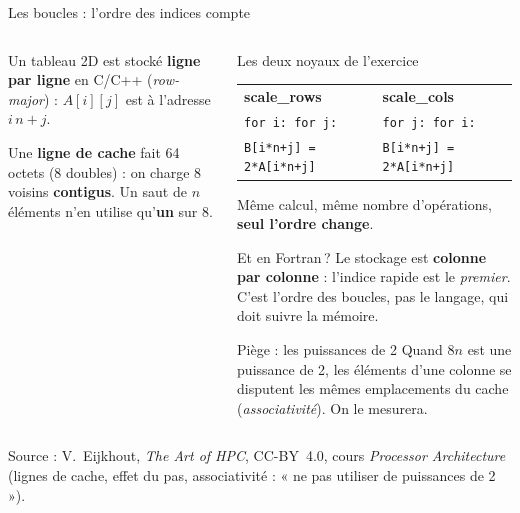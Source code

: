 \documentclass[8pt,aspectratio=169]{beamer}
\newcommand{\src}[1]{\vfill{\tiny\color{gray}Source : #1\par}}
\newcommand{\eij}{V.~Eijkhout, \emph{The Art of HPC}, CC-BY~4.0}
\begin{document}
\begin{frame}{Les boucles : l'ordre des indices compte}
\begin{columns}[T]
\begin{column}{0.5\textwidth}
Un tableau 2D est stocké \textbf{ligne par ligne} en C/C++ (\emph{row-major}) : $A[i][j]$ est à l'adresse $i\,n+j$.

\medskip
\centering
{}

\medskip
\raggedright
Une \textbf{ligne de cache} fait 64 octets (8 doubles) : on charge 8 voisins \textbf{contigus}. Un saut de $n$ éléments n'en utilise qu'\textbf{un} sur 8.
\end{column}
\begin{column}{0.46\textwidth}
\begin{block}{Les deux noyaux de l'exercice}
\begin{tabular}{@{}L{3.4cm}L{3.4cm}@{}}
\textbf{scale\_rows} & \textbf{scale\_cols}\\
\texttt{for i: for j:} & \texttt{for j: for i:}\\
\texttt{B[i*n+j] = 2*A[i*n+j]} & \texttt{B[i*n+j] = 2*A[i*n+j]}\\
\end{tabular}
\end{block}
Même calcul, même nombre d'opérations, \textbf{seul l'ordre change}.

\medskip
\begin{alertblock}{Et en Fortran\,?}
Le stockage est \textbf{colonne par colonne} : l'indice rapide est le \emph{premier}. C'est l'ordre des boucles, pas le langage, qui doit suivre la mémoire.
\end{alertblock}
\begin{exampleblock}{Piège : les puissances de 2}
Quand $8n$ est une puissance de 2, les éléments d'une colonne se disputent les mêmes emplacements du cache (\emph{associativité}). On le mesurera.
\end{exampleblock}
\end{column}
\end{columns}
\src{\eij{}, cours \emph{Processor Architecture} (lignes de cache, effet du pas, associativité : « ne pas utiliser de puissances de 2 »).}
\end{frame}
\end{document}
